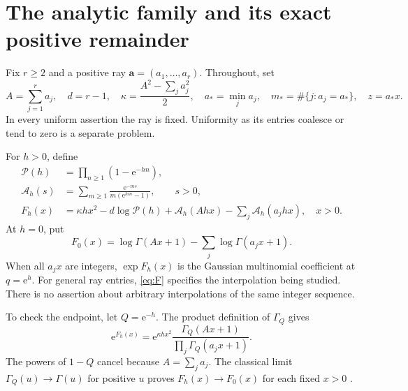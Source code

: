 \documentclass[11pt,a4paper]{article}
\numberwithin{equation}{section}
\theoremstyle{definition}\newtheorem{definition}[theorem]{Definition}
\theoremstyle{remark}\newtheorem{remark}[theorem]{Remark}
\newcommand{\e}{\mathrm e}
\newcommand{\avec}{\boldsymbol a}
\newcommand{\astar}{a_*}
\newcommand{\mstar}{m_*}
\newcommand{\calP}{\mathcal P}
\newcommand{\calA}{\mathcal A}
\begin{document}
\section{The analytic family and its exact positive remainder}
\label{sec:family}

Fix $r\ge2$ and a positive ray $\avec=(a_1,\ldots,a_r)$. Throughout, set
\begin{equation}
 A=\sum_{j=1}^r a_j,\quad d=r-1,\quad
 \kappa=\frac{A^2-\sum_j a_j^2}{2},\quad
 \astar=\min_j a_j,\quad
 \mstar=\#\{j:a_j=\astar\},\quad z=\astar x.
 \label{eq:parameters}
\end{equation}
In every uniform assertion the ray is fixed. Uniformity as its entries
coalesce or tend to zero is a separate problem.

For $h>0$, define
\begin{align}
 \calP(h)&=\prod_{n\ge1}(1-\e^{-hn}),\label{eq:product}\\
 \calA_h(s)&=\sum_{m\ge1}\frac{\e^{-ms}}{m(\e^{hm}-1)},\qquad s>0,\\
 F_h(x)&=\kappa hx^2-d\log\calP(h)
       +\calA_h(Ahx)-\sum_j\calA_h(a_jhx),\quad x>0.
 \label{eq:F}
\end{align}
At $h=0$, put
\begin{equation}
 F_0(x)=\log\Gamma(Ax+1)-\sum_j\log\Gamma(a_jx+1).
 \label{eq:Fzero}
\end{equation}
When all $a_jx$ are integers, $\exp F_h(x)$ is the Gaussian multinomial
coefficient at $q=\e^h$. For general ray entries, \eqref{eq:F} specifies the
interpolation being studied. There is no assertion about arbitrary
interpolations of the same integer sequence.

To check the endpoint, let $Q=\e^{-h}$. The product definition of
$\Gamma_Q$ gives
\begin{equation}
 \e^{F_h(x)}=\e^{\kappa hx^2}
 \frac{\Gamma_Q(Ax+1)}{\prod_j\Gamma_Q(a_jx+1)}.
 \label{eq:qgamma}
\end{equation}
The powers of $1-Q$ cancel because $A=\sum_j a_j$.
The classical limit $\Gamma_Q(u)\to\Gamma(u)$ for positive $u$ proves
$F_h(x)\to F_0(x)$ for each fixed $x>0$ \cite{dlmf-qgamma}.
\end{document}
